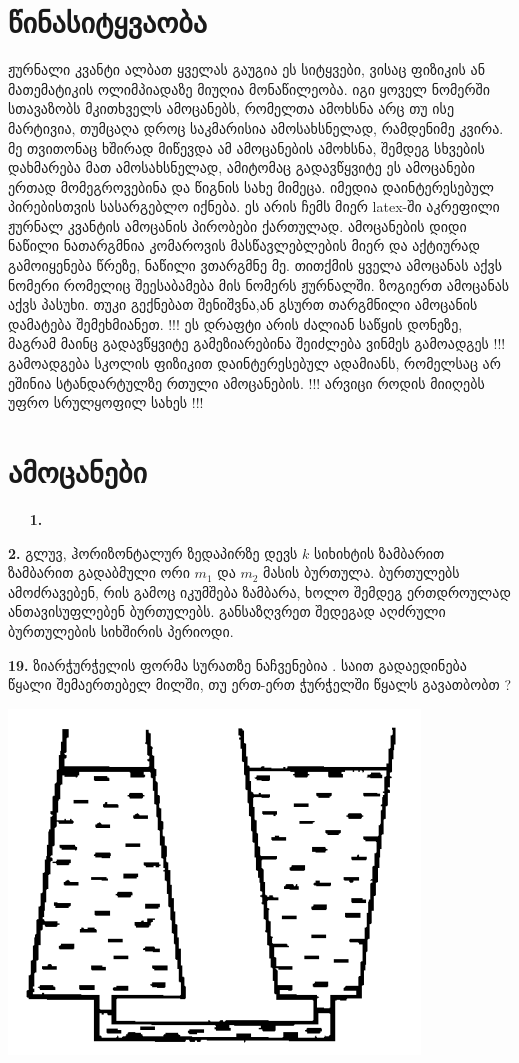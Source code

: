 \documentclass[12pt,a4paper,]{report}
\begin{document}
\tableofcontents

\newpage

\chapter{წინასიტყვაობა}
	ჟურნალი კვანტი ალბათ ყველას გაუგია ეს სიტყვები, ვისაც ფიზიკის ან მათემატიკის ოლიმპიადაზე მიუღია მონაწილეობა. იგი ყოველ ნომერში სთავაზობს მკითხველს ამოცანებს, რომელთა ამოხსნა არც თუ ისე მარტივია, თუმცაღა დროც საკმარისია ამოსახსნელად, რამდენიმე კვირა. მე თვითონაც ხშირად მიწევდა ამ ამოცანების ამოხსნა, შემდეგ სხვების დახმარება მათ ამოსახსნელად, ამიტომაც გადავწყვიტე ეს ამოცანები ერთად მომეგროვებინა და წიგნის სახე მიმეცა. იმედია დაინტერესებულ პირებისთვის სასარგებლო იქნება. ეს არის ჩემს მიერ latex-ში აკრეფილი ჟურნალ კვანტის ამოცანის პირობები ქართულად. ამოცანების დიდი ნაწილი ნათარგმნია კომაროვის მასწავლებლების მიერ და აქტიურად გამოიყენება წრეზე, ნაწილი ვთარგმნე მე. თითქმის ყველა ამოცანას აქვს ნომერი რომელიც შეესაბამება მის ნომერს ჟურნალში. ზოგიერთ ამოცანას აქვს პასუხი. თუკი გექნებათ შენიშვნა,ან გსურთ თარგმნილი ამოცანის დამატება შემეხმიანეთ. !!! ეს დრაფტი არის ძალიან საწყის დონეზე, მაგრამ მაინც გადავწყვიტე გამეზიარებინა შეიძლება ვინმეს გამოადგეს !!! გამოადგება სკოლის ფიზიკით დაინტერესებულ ადამიანს, რომელსაც არ ეშინია სტანდარტულზე რთული ამოცანების. !!! არვიცი როდის მიიღებს უფრო სრულყოფილ სახეს !!!
	
	
\chapter{ამოცანები}
$\ \quad$ \textbf{1.} 

\textbf{2.} გლუვ, ჰორიზონტალურ ზედაპირზე დევს $k$ სიხიხტის ზამბარით ზამბარით გადაბმული ორი $m_1$ და $m_2$ მასის ბურთულა. ბურთულებს ამოძრავებენ, რის გამოც იკუმშება ზამბარა, ხოლო შემდეგ ერთდროულად ანთავისუფლებენ ბურთულებს. განსაზღვრეთ შედეგად აღძრული ბურთულების სიხშირის პერიოდი.
 
\textbf{19.} ზიარჭურჭელის ფორმა სურათზე ნაჩვენებია . საით გადაედინება წყალი შემაერთებელ მილში, თუ ერთ-ერთ ჭურჭელში წყალს გავათბობთ ? 
		\begin{center}
			\includegraphics[scale=0.3]{images/19.png}
		\end{center}
\end{document}
